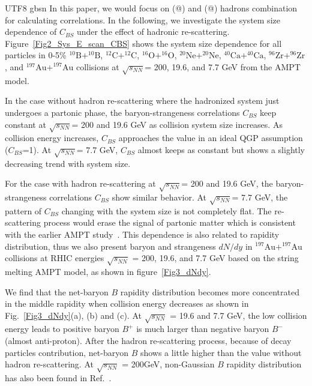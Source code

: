 \documentclass[twocolumn,showpacs,preprintnumbers,amsmath,amssymb]{revtex4-1}
\makeatletter
\newcommand{\Rmnum}[1]{\expandafter\@slowromancap\romannumeral #1@}
\makeatother
\begin{document}
\begin{CJK*} {UTF8} {gbsn}
	In this paper, we would focus on (\Rmnum{1}) and (\Rmnum{2}) hadrons combination for calculating correlations. In the following, we investigate the system size dependence of $C_{BS}$ under the effect of hadronic re-scattering. Figure~\ref{Fig2_Sys_E_scan_CBS} shows the system size dependence for all particles in 0-5\% $\mathrm{^{10}B+^{10}B}$, $\mathrm{^{12}C+^{12}C}$, $\mathrm{^{16}O+^{16}O}$, $\mathrm{^{20}Ne+^{20}Ne}$, $\mathrm{^{40}Ca+^{40}Ca}$, $\mathrm{^{96}Zr+^{96}Zr}$, and $\mathrm{^{197}Au+^{197}Au}$ collisions at $\sqrt{s_{NN}}$= 200, 19.6, and 7.7 GeV from the AMPT model. 
	
	In the case without hadron re-scattering where the hadronized system just undergoes a partonic phase, the baryon-strangeness correlations $C_{BS}$ keep constant at $\sqrt{s_{NN}}$= 200 and 19.6 GeV as collision system size increases. As collision energy increases, $C_{BS}$ approaches  the value in an ideal QGP assumption ($C_{BS}$=1). At $\sqrt{s_{NN}}$= 7.7 GeV, $C_{BS}$ almost keeps as constant but shows a slightly decreasing trend with system size.
	
	For the case with hadron re-scattering at $\sqrt{s_{NN}}$= 200 and 19.6 GeV, the baryon-strangeness correlations $C_{BS}$ show similar behavior. {} At $\sqrt{s_{NN}}$= 7.7 GeV, the pattern of $C_{BS}$ changing with the system size is not completely flat. { }The re-scattering process would erase the signal of partonic matter which is consistent with the earlier AMPT study~\cite{Jin_2008}.
{ This dependence is also related to rapidity distribution, thus} we also present baryon and strangeness $dN/dy$ in $\mathrm{^{197}Au+^{197}Au}$ collisions at RHIC energies $\sqrt{s_{NN}}$ = 200, 19.6, and 7.7 GeV based on the string melting AMPT model, as shown in figure~\ref{Fig3_dNdy}.
	 
 We find that the net-baryon $B$ rapidity distribution becomes more concentrated in the middle rapidity when collision energy decreases as shown in Fig.~\ref{Fig3_dNdy}(a), (b) and (c).
 At $\sqrt{s_{NN}}$ = 19.6 and 7.7 GeV, the low collision energy leads to positive baryon $B^{+}$ is much larger than negative baryon $B^{-}$ (almost anti-proton).
After the hadron re-scattering process, because of decay particles contribution, net-baryon $B$ shows a little higher than the value without hadron re-scattering{}. At $\sqrt{s_{NN}}$ = 200GeV, non-Gaussian $B$ rapidity distribution has also been found in Ref.~\cite{Lin_2017xkd}.


\end{CJK*}
\end{document}
